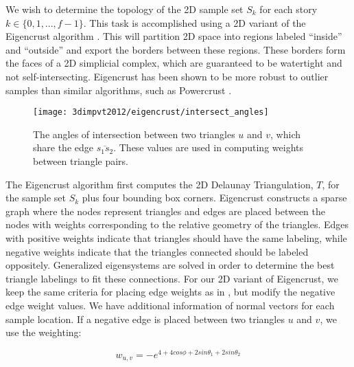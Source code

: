 \documentclass[12pt,onecolumn,oneside]{book}
\begin{document}
We wish to determine the topology of the 2D sample set $S_k$ for each story $k \in \{ 0, 1, ..., f-1 \}$.  This task is accomplished using a 2D variant of the Eigencrust algorithm \cite{EigencrustShewchuk}.  This will partition 2D space into regions labeled ``inside'' and ``outside'' and export the borders between these regions.  These borders form the faces of a 2D simplicial complex, which are guaranteed to be watertight and not self-intersecting.  Eigencrust has been shown to be more robust to outlier samples than similar algorithms, such as Powercrust \cite{EigencrustShewchuk, Powercrust}.

\begin{figure}[t]

\begin{minipage}[b]{1.0\linewidth}
  \centering
  \centerline{\texttt{[image: 3dimpvt2012/eigencrust/intersect\_angles]}}
\end{minipage}

\caption[Computing weighting between triangle pairs.]{The angles of intersection between two triangles $u$ and $v$, which share the edge $\overline{s_1 s_2}$. These values are used in computing weights between triangle pairs.}
\label{fig:intersect_angles}

\end{figure}

The Eigencrust algorithm first computes the 2D Delaunay Triangulation, $T$, for the sample set $S_k$ plus four bounding box corners.  Eigencrust constructs a sparse graph where the nodes represent triangles and edges are placed between the nodes with weights corresponding to the relative geometry of the triangles.  Edges with positive weights indicate that triangles should have the same labeling, while negative weights indicate that the triangles connected should be labeled oppositely.  Generalized eigensystems are solved in order to determine the best triangle labelings to fit these connections.  For our 2D variant of Eigencrust, we keep the same criteria for placing edge weights as in \cite{EigencrustShewchuk}, but modify the negative edge weight values.  We have additional information of normal vectors for each sample location. If a negative edge is placed between two triangles $u$ and $v$, we use the weighting:

\begin{equation}
w_{u,v} = - e ^ {4 + 4 cos \phi + 2 sin \theta_1 + 2 sin \theta_2}
\label{neg_edge_weight}
\end{equation}
\end{document}
